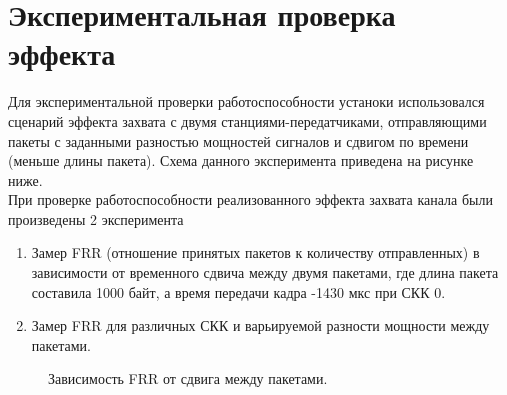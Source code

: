 \documentclass{llncs}
\begin{document}
\section{Экспериментальная проверка эффекта}
Для экспериментальной проверки работоспособности устаноки использовался сценарий эффекта захвата с двумя станциями-передатчиками, отправляющими пакеты с заданными разностью мощностей сигналов и сдвигом по времени (меньше длины пакета). Схема данного эксперимента приведена на рисунке ниже. 
\\
При проверке работоспособности реализованного эффекта захвата канала были произведены 2 эксперимента 
\begin{enumerate}
\item Замер FRR (отношение принятых пакетов к количеству отправленных) в зависимости от временного сдвича между двумя пакетами, где длина пакета составила 1000 байт, а время передачи кадра -1430 мкс при СКК 0. 
\item Замер FRR для различных СКК и варьируемой разности мощности между пакетами.
\end{enumerate}
\begin{figure}[ht!]

\caption{Зависимость FRR от сдвига между пакетами.}
\label{ris:image}
\end{figure}
\end{document}
